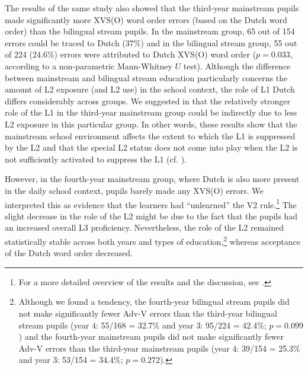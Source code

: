 \documentclass[output=paper]{langsci/langscibook}
\begin{document}
\begin{table}[p]
\caption{Adv-V and V2 errors in fourth-year bilingual (B) stream and mainstream (M) group\label{tab:stadt:3}}
\end{table}

The results of the same study also showed that the third-year mainstream pupils made significantly more XVS(O) word order errors (based on the Dutch word order) than the bilingual stream pupils. In the mainstream group, 65 out of 154 errors could be traced to Dutch (37\%) and in the bilingual stream group, 55 out of 224 (24.6\%) errors were attributed to Dutch XVS(O) word order ($p = 0.033$, according to a non-parametric Mann-Whitney $U$ test). Although the difference between mainstream and bilingual stream education particularly concerns the amount of L2 exposure (and L2 use) in the school context, the role of L1 Dutch differs considerably across groups. We suggested in \citet{StadtEtAl2016, StadtEtAl2018Exposure} that the relatively stronger role of the L1 in the third-year mainstream group could be indirectly due to less L2 exposure in this particular group. In other words, these results show that the mainstream school environment affects the extent to which the L1 is suppressed by the L2 and that the special L2 status does not come into play when the L2 is not sufficiently activated to suppress the L1 (cf. \citealt{Hammarberg2001}).

However, in the fourth-year mainstream group, where Dutch is also more present in the daily school context, pupils barely made any XVS(O) errors. We interpreted this as evidence that the learners had ``unlearned'' the V2 rule.\footnote{For a more detailed overview of the results and the discussion, see \citet{StadtEtAl2016, StadtEtAl2018Exposure}.} The slight decrease in the role of the L2 might be due to the fact that the pupils had an increased overall L3 proficiency. Nevertheless, the role of the L2 remained statistically stable across both years and types of education,\footnote{Although we found a tendency, the fourth-year bilingual stream pupils did not make significantly fewer Adv-V errors than the third-year bilingual stream pupils (year 4: 55/168 = 32.7\% and year 3: 95/224 = 42.4\%; $p = 0.099$) and the fourth-year mainstream pupils did not make significantly fewer Adv-V errors than the third-year mainstream pupils (year 4: 39/154 = 25.3\% and year 3: 53/154 = 34.4\%; $p = 0.272$).} whereas acceptance of the Dutch word order decreased.\largerpage[-2]
\end{document}
